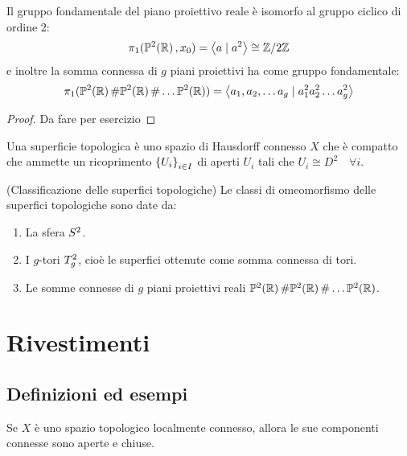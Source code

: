 \documentclass[]{article}
\begin{document}
\begin{proposition}  \nl
    Il gruppo fondamentale del piano proiettivo reale \`e isomorfo al gruppo ciclico di ordine 2:
    \[
        \pi_1(\mathbb{P}^{2}\!\left(\mathbb{R}\right), x_0) = \left< a \mid a^2 \right> \cong \mathbb{Z} / 2\mathbb{Z}
    \]
    e inoltre la somma connessa di $g$ piani proiettivi ha come gruppo fondamentale:
    \[
        \pi_1(\mathbb{P}^{2}\!\left(\mathbb{R}\right) \# \mathbb{P}^{2}\!\left(\mathbb{R}\right) \# \dots \mathbb{P}^{2}\!\left(\mathbb{R}\right)) = \left< a_1, a_2, \dots a_g \mid a_1^2a_2^2 \dots a_g^2\right>
    \]
\end{proposition}

\begin{proof}
    Da fare per esercizio
\end{proof}

\begin{definition}  \nl
    Una superficie topologica \`e uno spazio di Hausdorff connesso $X$ che \`e compatto che ammette un ricoprimento
    $\left\{ U_i \right\}_{i \in I}$ di aperti $U_i$ tali che $U_i \cong D^2 \quad \forall i$.
\end{definition}

\begin{theorem} (Classificazione delle superfici topologiche) \nl
    Le classi di omeomorfismo delle superfici topologiche sono date da:
    \begin{enumerate}
        \item La sfera $S^{2}$.
        \item I $g$-tori $T^{2}_{g}$, cio\`e le superfici ottenute come somma connessa di tori.
        \item Le somme connesse di $g$ piani proiettivi reali $\mathbb{P}^{2}\!\left(\mathbb{R}\right) \# \mathbb{P}^{2}\!\left(\mathbb{R}\right) \# \dots \mathbb{P}^{2}\!\left(\mathbb{R}\right)$.
    \end{enumerate}
    
\end{theorem}

\section{Rivestimenti}
\subsection{Definizioni ed esempi}

\begin{remark} 
    Se $X$ \`e uno spazio topologico localmente connesso, allora le sue componenti connesse sono aperte e chiuse.
\end{remark}
\end{document}
